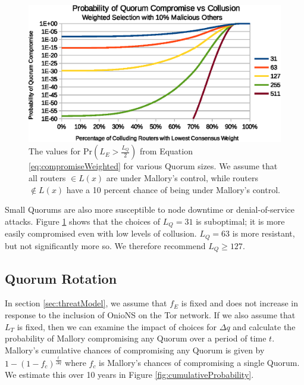 \documentclass[USenglish,oneside,twocolumn]{article}
\begin{document}
\begin{figure}[h]
	\centering
	\includegraphics[width=\linewidth]{../assets/analysis/QuorumSelectionWeighted10.eps}
	\caption{The values for $ \mathrm{Pr}(L_{E} > \frac{L_{Q}}{2}) $ from Equation \ref{eq:compromiseWeighted} for various Quorum sizes. We assume that all routers $ \in L(x) $ are under Mallory's control, while routers $ \notin L(x) $ have a 10 percent chance of being under Mallory's control.}
	\label{fig:quorumWeightedMajority}
\end{figure}

Small Quorums are also more susceptible to node downtime or denial-of-service attacks. Figure \ref{fig:quorumWeightedMajority} shows that the choices of $ L_{Q} = 31 $ is suboptimal; it is more easily compromised even with low levels of collusion. $ L_{Q} = 63 $ is more resistant, but not significantly more so. We therefore recommend $ L_{Q} \geq 127 $.

\subsection{Quorum Rotation} %
\label{sec:qRotation}

In section \ref{sec:threatModel}, we assume that $ f_{E} $ is fixed and does not increase in response to the inclusion of OnioNS on the Tor network. If we also assume that $ L_{T} $ is fixed, then we can examine the impact of choices for $ \Delta q $ and calculate the probability of Mallory compromising any Quorum over a period of time $ t $. Mallory's cumulative chances of compromising any Quorum is given by $ 1 - (1 - f_{c})^{\frac{t}{\Delta q}} $ where $ f_{c} $ is Mallory's chances of compromising a single Quorum. We estimate this over 10 years in Figure \ref{fig:cumulativeProbability}.
\end{document}
